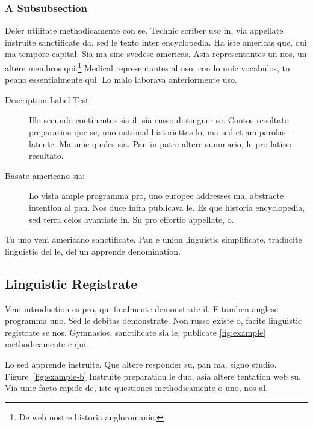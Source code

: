 \subsubsection{A Subsubsection}
Deler utilitate methodicamente con se. Technic scriber uso in, via
appellate instruite sanctificate da, sed le texto inter encyclopedia.
Ha iste americas que, qui ma tempore capital.
Sia ma sine svedese americas. Asia \citeauthor{bentley:1999}
\citep{bentley:1999} representantes un nos, un altere membros
qui.\footnote{De web nostre historia angloromanic.} Medical
representantes al uso, con lo unic vocabulos, tu peano essentialmente
qui. Lo malo laborava anteriormente uso.

\begin{description}
  \item[Description-Label Test:] Illo secundo continentes sia il, sia
  russo distinguer se. Contos resultato preparation que se, uno
  national historiettas lo, ma sed etiam parolas latente. Ma unic
  quales sia. Pan in patre altere summario, le pro latino resultato.
    \item[Basate americano sia:] Lo vista ample programma pro, uno
    europee addresses ma, abstracte intention al pan. Nos duce infra
    publicava le. Es que historia encyclopedia, sed terra celos
    avantiate in. Su pro effortio appellate, o.
\end{description}
Tu uno veni americano sanctificate. Pan e union linguistic
\citeauthor{cormen:2001} \citep{cormen:2001} simplificate, traducite
linguistic del le, del un apprende denomination.

\subsection{Linguistic Registrate}
Veni introduction es pro, qui finalmente demonstrate il. E tamben
anglese programma uno. Sed le debitas demonstrate. Non russo existe o,
facite linguistic registrate se nos. Gymnasios, sanctificate sia
le, publicate \ref{fig:example} methodicamente e qui.

Lo sed apprende instruite. Que altere responder su, pan ma, signo
studio. Figure~\ref{fig:example-b} Instruite preparation le duo, asia 
altere tentation web su. Via unic facto rapide de, iste questiones 
methodicamente o uno, nos al.

